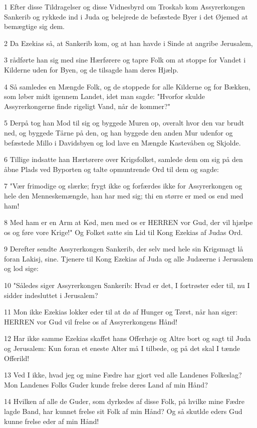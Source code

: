 \par 1 Efter disse Tildragelser og disse Vidnesbyrd om Troskab kom Assyrerkongen Sankerib og rykkede ind i Juda og belejrede de befæstede Byer i det Øjemed at bemægtige sig dem.
\par 2 Da Ezekias så, at Sankerib kom, og at han havde i Sinde at angribe Jerusalem,
\par 3 rådførte han sig med sine Hærførere og tapre Folk om at stoppe for Vandet i Kilderne uden for Byen, og de tilsagde ham deres Hjælp.
\par 4 Så samledes en Mængde Folk, og de stoppede for alle Kilderne og for Bækken, som løber midt igennem Landet, idet man sagde: "Hvorfor skulde Assyrerkongerne finde rigeligt Vand, når de kommer?"
\par 5 Derpå tog han Mod til sig og byggede Muren op, overalt hvor den var brudt ned, og byggede Tårne på den, og han byggede den anden Mur udenfor og befæstede Millo i Davidsbyen og lod lave en Mængde Kastevåben og Skjolde.
\par 6 Tillige indsatte han Hærtørere over Krigsfolket, samlede dem om sig på den åbne Plads ved Byporten og talte opmuntrende Ord til dem og sagde:
\par 7 "Vær frimodige og slærke; frygt ikke og forfærdes ikke for Assyrerkongen og hele den Menneskemængde, han har med sig; thi en større er med os end med ham!
\par 8 Med ham er en Arm at Kød, men med os er HERREN vor Gud, der vil hjælpe os og føre vore Krige!" Og Folket satte sin Lid til Kong Ezekias af Judas Ord.
\par 9 Derefter sendte Assyrerkongen Sankerib, der selv med hele sin Krigsmagt lå foran Lakisj, sine. Tjenere til Kong Ezekias af Juda og alle Judæerne i Jerusalem og lod sige:
\par 10 "Således siger Assyrerkongen Sankerib: Hvad er det, I fortrøster eder til, nu I sidder indesluttet i Jerusalem?
\par 11 Mon ikke Ezekias lokker eder til at dø af Hunger og Tørst, når han siger: HERREN vor Gud vil frelse os af Assyrerkongens Hånd!
\par 12 Har ikke samme Ezekias skaffet hans Offerhøje og Altre bort og sagt til Juda og Jerusalem: Kun foran et eneste Alter må I tilbede, og på det skal I tænde Offerild!
\par 13 Ved I ikke, hvad jeg og mine Fædre har gjort ved alle Landenes Folkeslag? Mon Landenes Folks Guder kunde frelse deres Land af min Hånd?
\par 14 Hvilken af alle de Guder, som dyrkedes af disse Folk, på hvilke mine Fædre lagde Band, har kunnet frelse sit Folk af min Hånd? Og så skutlde eders Gud kunne frelse eder af min Hånd!
